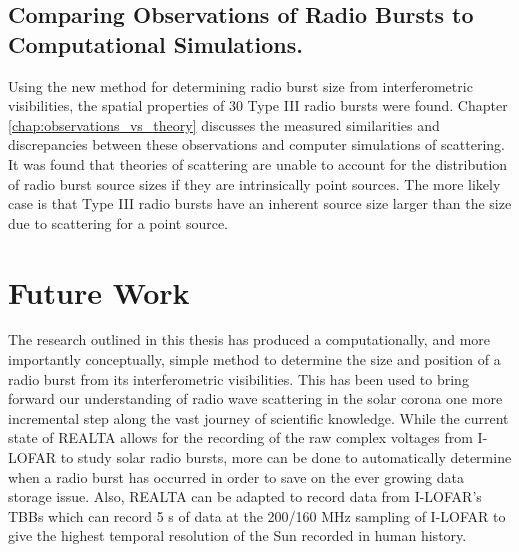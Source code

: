 \subsection{Comparing Observations of Radio Bursts to Computational Simulations.}
Using the new method for determining radio burst size from interferometric visibilities, the spatial properties of 30 Type III radio bursts were found. Chapter \ref{chap:observations_vs_theory} discusses the measured similarities and discrepancies between these observations and computer simulations of scattering. It was found that theories of scattering are unable to account for the distribution of radio burst source sizes if they are intrinsically point sources. The more likely case is that Type III radio bursts have an inherent source size larger than the size due to scattering for a point source. 

\section{Future Work}
The research outlined in this thesis has produced a computationally, and more importantly conceptually, simple method to determine the size and position of a radio burst from its interferometric visibilities. This has been used to bring forward our understanding of radio wave scattering in the solar corona one more incremental step along the vast journey of scientific knowledge. While the current state of REALTA allows for the recording of the raw complex voltages from I-LOFAR to study solar radio bursts, more can be done to automatically determine when a radio burst has occurred in order to save on the ever growing data storage issue. Also, REALTA can be adapted to record data from I-LOFAR's TBBs which can record 5 s of data at the 200/160 MHz sampling of I-LOFAR to give the highest temporal resolution of the Sun recorded in human history. 
 
